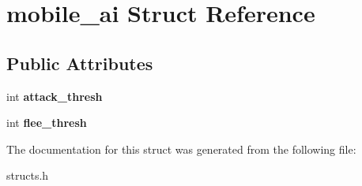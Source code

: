 \hypertarget{structmobile__ai}{\section{mobile\-\_\-ai Struct Reference}
\label{structmobile__ai}
}
\subsection*{Public Attributes}
\begin{DoxyCompactItemize}
\item 
\hypertarget{structmobile__ai_a36cb2006278ac58ddd56ef4a4db1e14d}{int {\bfseries attack\-\_\-thresh}}\label{structmobile__ai_a36cb2006278ac58ddd56ef4a4db1e14d}

\item 
\hypertarget{structmobile__ai_a5be32b2d2b489f7f43c3e6c667238eb0}{int {\bfseries flee\-\_\-thresh}}\label{structmobile__ai_a5be32b2d2b489f7f43c3e6c667238eb0}

\end{DoxyCompactItemize}


The documentation for this struct was generated from the following file\-:\begin{DoxyCompactItemize}
\item 
structs.\-h\end{DoxyCompactItemize}
